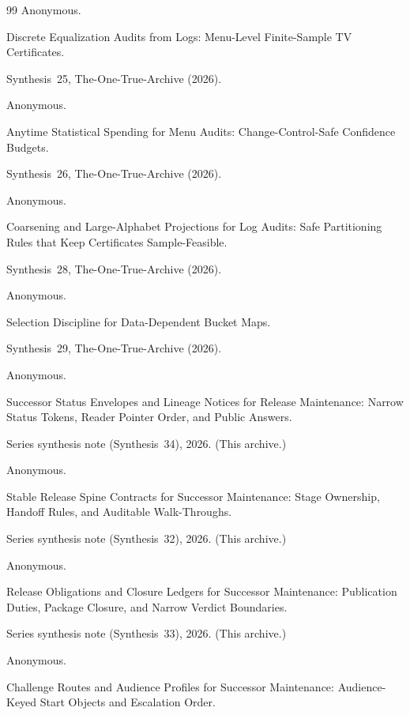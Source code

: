 \documentclass[11pt]{article}
\begin{document}
\begin{thebibliography}{99}
Anonymous.

\newblock Discrete Equalization Audits from Logs: Menu-Level Finite-Sample TV Certificates.

\newblock Synthesis~25, The-One-True-Archive (2026).

Anonymous.

\newblock Anytime Statistical Spending for Menu Audits: Change-Control-Safe Confidence Budgets.

\newblock Synthesis~26, The-One-True-Archive (2026).

Anonymous.

\newblock Coarsening and Large-Alphabet Projections for Log Audits: Safe Partitioning Rules that Keep Certificates Sample-Feasible.

\newblock Synthesis~28, The-One-True-Archive (2026).

Anonymous.

\newblock Selection Discipline for Data-Dependent Bucket Maps.

\newblock Synthesis~29, The-One-True-Archive (2026).

Anonymous.

\newblock Successor Status Envelopes and Lineage Notices for Release Maintenance: Narrow Status Tokens, Reader Pointer Order, and Public Answers.

\newblock Series synthesis note (Synthesis~34), 2026. (This archive.)

Anonymous.

\newblock Stable Release Spine Contracts for Successor Maintenance: Stage Ownership, Handoff Rules, and Auditable Walk-Throughs.

\newblock Series synthesis note (Synthesis~32), 2026. (This archive.)

Anonymous.

\newblock Release Obligations and Closure Ledgers for Successor Maintenance: Publication Duties, Package Closure, and Narrow Verdict Boundaries.

\newblock Series synthesis note (Synthesis~33), 2026. (This archive.)

Anonymous.

\newblock Challenge Routes and Audience Profiles for Successor Maintenance: Audience-Keyed Start Objects and Escalation Order.


\end{thebibliography}
\end{document}
